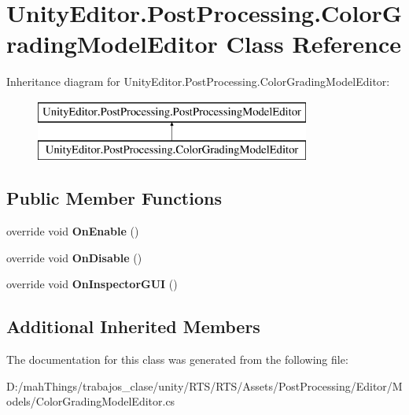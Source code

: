 \hypertarget{class_unity_editor_1_1_post_processing_1_1_color_grading_model_editor}{}\section{Unity\+Editor.\+Post\+Processing.\+Color\+Grading\+Model\+Editor Class Reference}
\label{class_unity_editor_1_1_post_processing_1_1_color_grading_model_editor}
Inheritance diagram for Unity\+Editor.\+Post\+Processing.\+Color\+Grading\+Model\+Editor\+:\begin{figure}[H]
\begin{center}
\leavevmode
\includegraphics[height=2.000000cm]{class_unity_editor_1_1_post_processing_1_1_color_grading_model_editor}
\end{center}
\end{figure}
\subsection*{Public Member Functions}
\begin{DoxyCompactItemize}
\item 
\mbox{\label{class_unity_editor_1_1_post_processing_1_1_color_grading_model_editor_a9304ac2ec59d4c192e9783635da1592e}} 
override void {\bfseries On\+Enable} ()
\item 
\mbox{\label{class_unity_editor_1_1_post_processing_1_1_color_grading_model_editor_aab4148dee7ad4938498e7f12556ebac6}} 
override void {\bfseries On\+Disable} ()
\item 
\mbox{\label{class_unity_editor_1_1_post_processing_1_1_color_grading_model_editor_a72e18f9836c9d26b8ee326d7f9e0f855}} 
override void {\bfseries On\+Inspector\+G\+UI} ()
\end{DoxyCompactItemize}
\subsection*{Additional Inherited Members}


The documentation for this class was generated from the following file\+:\begin{DoxyCompactItemize}
\item 
D\+:/mah\+Things/trabajos\+\_\+clase/unity/\+R\+T\+S/\+R\+T\+S/\+Assets/\+Post\+Processing/\+Editor/\+Models/Color\+Grading\+Model\+Editor.\+cs\end{DoxyCompactItemize}
